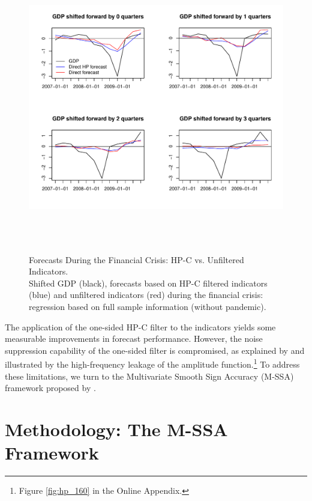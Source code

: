 \documentclass[11pt,a4paper]{article}
\begin{document}
\begin{figure}[H]
    \begin{center}
        \includegraphics[height=5in, width=6in]{./Figures/direct_hp_forecasts_financial_crisis.pdf}
        \caption{Forecasts During the Financial Crisis: HP-C vs. Unfiltered Indicators.\\
        Shifted GDP (black), forecasts based on HP-C filtered indicators (blue) and unfiltered indicators (red) during the financial crisis: regression based on full sample information (without pandemic).
        \label{fig:direct_hp_forecasts_financial_crisis}}
    \end{center}
\end{figure}


The application of the one-sided HP-C filter to the indicators yields some measurable improvements in forecast performance. However, the noise suppression capability of the one-sided filter is compromised, as explained by \cite{Wildi2025} and illustrated by the high-frequency leakage of the amplitude function.\footnote{Figure \ref{fig:hp_160} in the Online Appendix.} To address these limitations, we turn to the Multivariate Smooth Sign Accuracy (M-SSA) framework proposed by \cite{Wildi2025}.


\section{Methodology: The M-SSA Framework
\label{sec:mSSA}}
\end{document}
